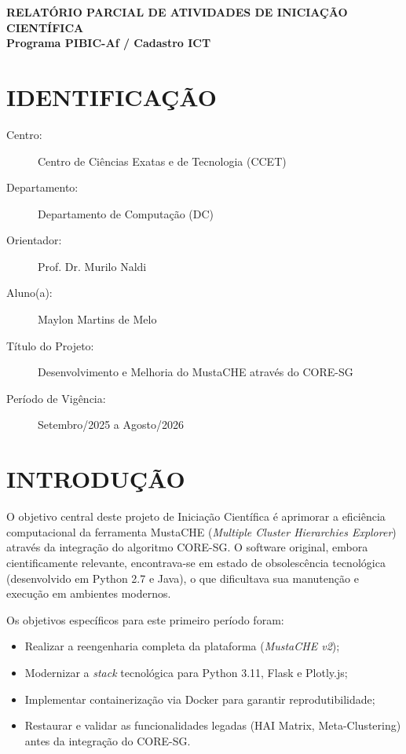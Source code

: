 \documentclass[12pt,a4paper]{article}
\begin{document}
\begin{center}
    \textbf{RELATÓRIO PARCIAL DE ATIVIDADES DE INICIAÇÃO CIENTÍFICA}\\
    \textbf{Programa PIBIC-Af / Cadastro ICT}
\end{center}

\section{IDENTIFICAÇÃO}

\begin{description}
    \item[Centro:] Centro de Ciências Exatas e de Tecnologia (CCET)
    \item[Departamento:] Departamento de Computação (DC)
    \item[Orientador:] Prof. Dr. Murilo Naldi
    \item[Aluno(a):] Maylon Martins de Melo
    \item[Título do Projeto:] Desenvolvimento e Melhoria do MustaCHE através do CORE-SG
    \item[Período de Vigência:] Setembro/2025 a Agosto/2026
\end{description}

\section{INTRODUÇÃO}

O objetivo central deste projeto de Iniciação Científica é aprimorar a eficiência computacional da ferramenta MustaCHE (\textit{Multiple Cluster Hierarchies Explorer}) através da integração do algoritmo CORE-SG. O software original, embora cientificamente relevante, encontrava-se em estado de obsolescência tecnológica (desenvolvido em Python 2.7 e Java), o que dificultava sua manutenção e execução em ambientes modernos.

Os objetivos específicos para este primeiro período foram:
\begin{itemize}
    \item Realizar a reengenharia completa da plataforma (\textit{MustaCHE v2});
    \item Modernizar a \textit{stack} tecnológica para Python 3.11, Flask e Plotly.js;
    \item Implementar containerização via Docker para garantir reprodutibilidade;
    \item Restaurar e validar as funcionalidades legadas (HAI Matrix, Meta-Clustering) antes da integração do CORE-SG.
\end{itemize}
\end{document}
